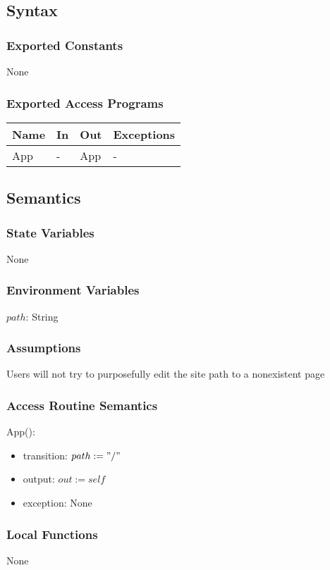 \documentclass[12pt, titlepage]{article}
\begin{document}
\subsection{Syntax}
\subsubsection{Exported Constants}
None
\subsubsection{Exported Access Programs}
\begin{center}
	\begin{tabular}{p{3cm} p{4cm} p{4cm} p{3cm}}
		
		\hline
		\textbf{Name} & \textbf{In} & \textbf{Out} & \textbf{Exceptions} \\
		\hline
		App & - & App & - \\
		\hline
	\end{tabular}
\end{center}
\subsection{Semantics}
\subsubsection{State Variables}
None
\subsubsection{Environment Variables}
$path$: String
\subsubsection{Assumptions}
Users will not try to purposefully edit the site path to a nonexistent page
\subsubsection{Access Routine Semantics}
App():
\begin{itemize}
	\item transition: $path := "/"$
	\item output: $out := self$
	\item exception: None
\end{itemize}
\subsubsection{Local Functions}
None
\end{document}
